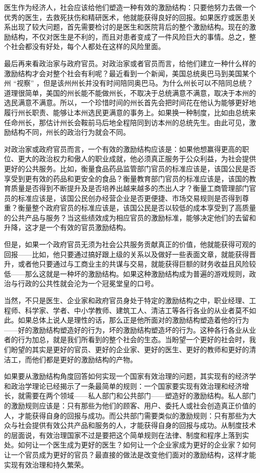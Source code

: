 医生作为经济人，社会应该给他们塑造一种有效的激励结构：只要他努力去做一个优秀的医生，去救死扶伤和精研医术，他就能获得良好的回报。如果医疗或医患关系出现了较大问题，首先需要检讨的是医生和医院背后的整个激励结构。现在的激励结构，不仅对医生是不利的，而且对患者变成了一件风险巨大的事情。总之，整个社会都没有好处，每个人都处在这样的风险里面。

最后再来看政治家与政府官员。对政治家或者官员而言，给他们建立一种什么样的激励结构才会对整个社会有利呢？最近看到一个新闻，美国总统奥巴马到美国某个州 “视察” ，但是该州州长并没有时间陪同奥巴马。为什么州长可以不陪同总统？道理很简单，美国的州长能不能做州长，不取决于总统满意不满意，取决于本州的选民满意不满意。所以，一个珍惜时间的州长首先会把时间花在他认为能够更好地履行州长职责、能够让本州选民更满意的事务上。如果换一种制度，比如由总统来任命州长，那估计州长会鞍前马后地全程陪同到访本州的总统先生。由此可见，激励结构不同，州长的政治行为就会不同。

对政治家或政府官员而言，一个有效的激励结构应该是：如果他想赢得更高的职位、更大的政治权力和傲人的职业成就，他必须真正服务于公众利益，为社会提供更好的公共服务。比如，衡量食品药品监管部门官员的标准应该是，该国公民是否享受到更有效的药品和更安全的食品？衡量教育部门官员的标准应该是，该国的教育质量是否得到不断提升及是否培养出越来越多的杰出人才？衡量工商管理部门官员的标准应该是，该国公民创办经营企业是否更便捷、市场交易规则是否得到尊重？衡量整个政府官员的标准应该是，该国公民是否以较低的成本享受到了高质量的公共产品与服务？当这些绩效成为相应官员的激励标准，能够决定他们的去留和升降，这才是一个有效的官员激励结构。

但是，如果一个政府官员无须为社会公共服务贡献真正的价值，他就能获得可观的回报——比如，他只要通过搞好跟上级的关系以及做好一些表面文章，就能获得晋升，或者他只要通过与工商业主的共谋与交易，就能获得巨额的财务收益且风险较低——那么这就是一种坏的激励结构。如果这种激励结构成为普遍的游戏规则，政治与行政的公共性就会沦为一个冠冕堂皇的口号。

当然，不只是医生、企业家和政府官员身处于特定的激励结构之中，职业经理、工程师、科学家、学者、中小学教师、建筑工人、清洁工等各行各业的从业者莫不如此。如果总体上说人是理性的话，那么正是他所面对的激励结构塑造着他的行为——好的激励结构塑造好的行为，坏的激励结构塑造坏的行为。这种各行各业从业者的行为加总，就是我们所看到的整个社会的生态。当盼望一个更好的社会时，我们盼望的其实是更好的官员、更好的企业家、更好的医生、更好的教师和更好的清洁工，而他们都是更好的激励结构的产物。

如果要从激励结构角度回答如何实现一个国家有效治理的问题，其实现有的经济学和政治学理论已经揭示了一条最简单的规则：一个国家要实现有效治理和经济增长，就需要在两个领域——私人部门和公共部门——塑造好的激励结构。私人部门的激励规则应该是：只有那些为他们的顾客、用户、委托人或社会创造真正价值的人，才能获得自身的回报与成功。而公共部门需要类似的激励规则：只有那些为大众与社会提供有效公共产品和服务的人，才能获得自身的回报与成功。从制度技术的层面说，有效治理国家不过是要把这个简单规则在法律、制度和程序上落到实处。如何让一个医生成为更好的医生？如何让一个企业家成为更好的企业家？如何让一个官员成为更好的官员？最直接的做法是改变他们面对的激励结构，这样才能实现有效治理和持久繁荣。

